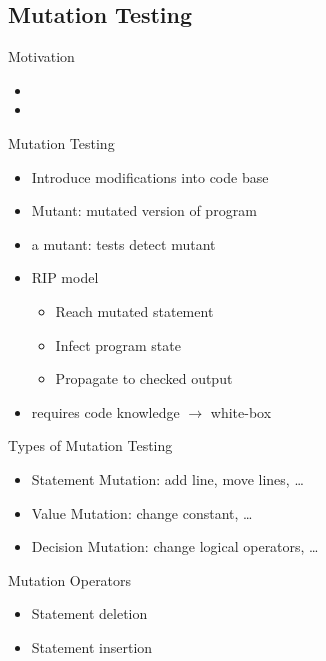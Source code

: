 \subsection{Mutation Testing}
\begin{frame}{\insertsubsection}
	\begin{fancycolumns}[animation=none]
		\begin{note}{Motivation}
			\begin{itemize}
				\item {}
				\item {}
			\end{itemize}
		\end{note}\pause
		\begin{definition}{Mutation Testing \mysource{\mutation}}
			\begin{itemize}
				\item Introduce modifications into code base
				\item Mutant: mutated version of program
				\item {} a mutant: tests detect mutant
				\item RIP model
				\begin{itemize}
					\item Reach mutated statement
					\item Infect program state
					\item Propagate to checked output
				\end{itemize}
				\item requires code knowledge $\rightarrow$ white-box
			\end{itemize}
		\end{definition}\pause
		\nextcolumn
		\small
		\begin{note}{Types of Mutation Testing}
			\begin{itemize}
				\item Statement Mutation: add line, move lines, \dots
				\item Value Mutation: change constant, \dots
				\item Decision Mutation: change logical operators, \dots
			\end{itemize}
		\end{note}\pause
		\begin{note}{Mutation Operators}
			\begin{itemize}
				\item Statement deletion
				\item Statement insertion

\end{itemize}
\end{note}
\end{fancycolumns}
\end{frame}
